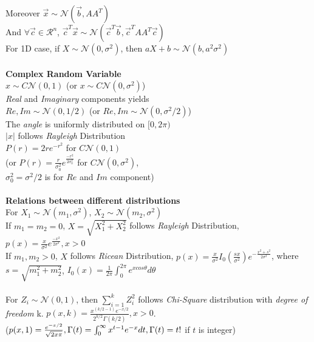 \documentclass [12pt] {article}
\begin{document}
\begin{spacing}{1.5}
\begin{multicols}{2}
Moreover $\vec{x} \sim \mathcal{N}(\vec{b}, A A^T)$\\
And $\forall \vec c \in \mathcal{R}^n$, $\vec{c}^T \vec{x} \sim \mathcal{N}(\vec{c}^T \vec{b}, \vec{c}^T A A^T \vec{c})$\\
For 1D case, if $X \sim \mathcal{N}(0,\sigma^2)$, then $aX+b \sim \mathcal{N}(b, a^2\sigma^2)$\\
~\\
\textbf{Complex Random Variable}\\
 $x \sim C\mathcal{N}(0,1)$ (or $x \sim C\mathcal{N}(0,\sigma^2)$)\\
 \emph{Real} and \emph{Imaginary} components yields \\
 $Re, Im\sim \mathcal{N}(0, 1/2)$ (or $Re, Im\sim \mathcal{N}(0, \sigma^2 /2)$)\\
 The \emph{angle} is uniformly distributed on $[0, 2\pi)$\\
 $|x|$ follows \emph{Rayleigh} Distribution\\
 $P(r) = 2r e^{-r^2}$ for $C\mathcal{N}(0,1)$\\
 (or $P(r) = \frac{r}{\sigma_0^2} e^{\frac{-r^2}{2\sigma_0^2}}$ for $C\mathcal{N}(0, \sigma^2)$, \\
 $\sigma_0^2 =\sigma^2/2$ is for $Re$ and $Im$ component)\\
 ~\\
 \textbf{Relations between different distributions}\\
For $X_1 \sim \mathcal{N}(m_1, \sigma^2)$, $X_2 \sim \mathcal{N}(m_2, \sigma^2)$\\
If $m_1 = m_2 = 0$, $X = \sqrt{X_1^2 + X_2 ^2}$ follows \emph{Rayleigh} Distribution, $p(x) = \frac{x}{\sigma^2} e^{\frac{-x^2}{2\sigma^2}}, x>0$\\
If $m_1, m_2 >0$, $X$ follows \emph{Ricean} Distribution, $p(x) = \frac{x}{\sigma ^2}I_0(\frac{s x}{\sigma^2})e^{-\frac{x^2+s^2}{2\sigma^2}}$, where $s = \sqrt{m_1^2 + m_2^2}$, $I_0(x) = \frac{1}{2\pi}\int_0^{2\pi}e^{x cos \theta} d\theta$\\ 
~\\
For $Z_i \sim \mathcal{N}(0,1)$, then $\sum_{i=1}^{k} Z_i^2$ follows \emph{Chi-Square} distribution with \emph{degree of freedom} k. $p(x,k) = \frac{x^{(k/2-1)}e^{-x/2}}{2^{k/2}\Gamma(k/2)}, x>0$. \\
($p(x,1) = \frac{e^{-x/2}}{\sqrt{2x\pi}}, \\
\Gamma(t) = \int_0^\infty x^{t-1}e^{-x}dt, \Gamma(t) = t!$ if $t$ is integer)\\
~\\

\end{multicols}
\end{spacing}
\end{document}
